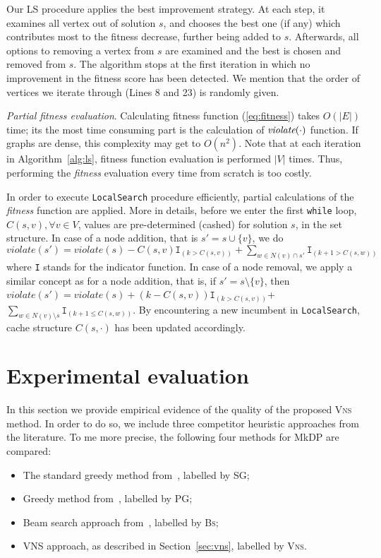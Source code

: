 \documentclass[dvipsnames,format=sigconf,anonymous=true,review=true]{acmart}
\begin{document}
Our LS procedure applies the best improvement strategy. At each step, it examines all vertex out of solution $s$, and chooses the best one (if any) which contributes most to the fitness decrease, further being added to $s$. Afterwards, all options to removing a vertex from $s$ are examined and the best is chosen and   removed from $s$.   The algorithm stops at the first iteration  in which no improvement in the fitness score has been detected.  We mention that the order of vertices we iterate through (Lines 8 and 23) is randomly given. 

\emph{Partial fitness evaluation}. Calculating fitness function (\ref{eq:fitness}) takes $O(|E|)$ time; its the most time consuming part is the calculation of $\emph{violate}(\cdot)$  function.   If graphs are dense, this complexity may get to  $O(n^2)$. Note that at each iteration in Algorithm~\ref{alg:ls},  fitness function evaluation is performed $|V|$ times. Thus, performing the \emph{fitness} evaluation every time from scratch is too costly. 

In order to execute \texttt{LocalSearch} procedure  efficiently, partial calculations of the \emph{fitness} function are applied. More in details, before we enter the first \texttt{while} loop, $C(s, v), \forall v \in V$, values are pre-determined (cashed) for solution $s$, in the set structure. In case of a node addition, that is  $s' = s \cup \{v\} $, we do $violate(s') = violate(s) - C(s, v)  \texttt{I}_{(k> C(s,v))}  + \sum_{w\in N(v) \cap s'} \texttt{I}_{(k+1 > C(s, w))}  $ where \texttt{I} stands for the indicator function. 
In case of a node removal, we apply a similar concept as for a node addition, that is, if $s' = s \setminus \{v\}$, then $violate(s') =  violate(s) + ( k - C(s, v)) \texttt{I}_{( k > C(s, v))} $+ $\sum_{ w \in   N(v)  \setminus s} \texttt{I}_{(k+1 \leq C(s, w)) }$. By encountering a new incumbent in \texttt{LocalSearch}, cache structure $C(s, \cdot)$ has been updated accordingly.


\section{Experimental evaluation}\label{sec:experiments}


In this section we provide empirical evidence of the quality of the proposed \textsc{Vns} method. In order to do so, we include three competitor heuristic approaches from the literature. To me more precise, the following four methods for MkDP are compared:  

\begin{itemize}
	\item The standard greedy method from~\cite{parekh1991analysis,gagarin2013randomized}, labelled by \textsc{SG};
	\item Greedy method from~\cite{gagarin2018multiple}, labelled by \textsc{PG};
	\item Beam search approach from~\cite{corcoran2021heuristics}, labelled by \textsc{Bs};
	\item VNS approach, as described in Section~\ref{sec:vns}, labelled by \textsc{Vns}.  
\end{itemize}
\end{document}
